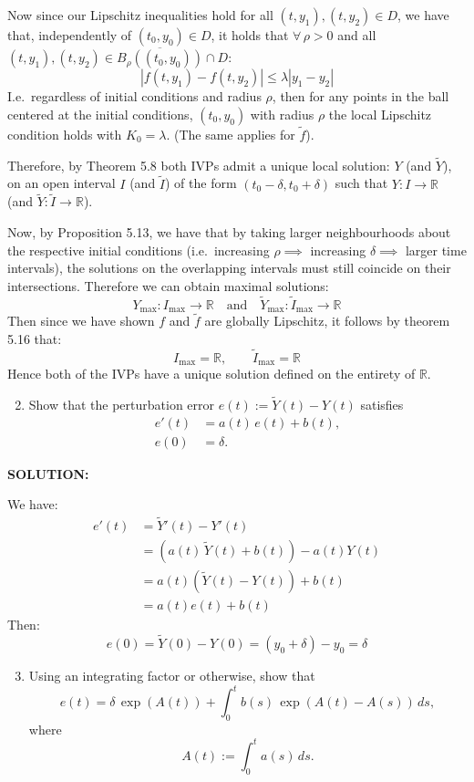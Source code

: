 \documentclass[]{article}
\begin{document}
\noindent Now since our Lipschitz inequalities hold for all $(t,y_1),(t,y_2)\in D$, we have that, independently of $(t_0,y_0)\in D$, it holds that $\forall\, \rho>0$ and all $(t,y_1),(t,y_2)\in \overline{B_{\rho}((t_0,y_0))}\cap D$:
\[
|f(t,y_1)-f(t,y_2)| \leq \lambda |y_1-y_2|
\]
\noindent I.e.\ regardless of initial conditions and radius $\rho$, then for any points in the ball centered at the initial conditions, $(t_0,y_0)$ with radius $\rho$ the local Lipschitz condition holds with $K_0=\lambda$. (The same applies for $\tilde f$).\newline

\noindent Therefore, by Theorem 5.8 both IVPs admit a unique local solution: $Y$ (and $\tilde{Y}$), on an open interval $I$ (and $\tilde I$) of the form $(t_0-\delta,t_0+\delta)$ such that $Y:I\to\mathbb{R}$ (and $\tilde{Y}:\tilde{I}\to\mathbb{R}$).\newline

\noindent Now, by Proposition 5.13, we have that by taking larger neighbourhoods about the respective initial conditions (i.e.\ increasing $\rho \implies$ increasing $\delta \implies $ larger time intervals), the solutions on the overlapping intervals must still coincide on their intersections. \noindent Therefore we can obtain maximal solutions:
\[
Y_{\max}:I_{\max}\to\mathbb{R} \quad \text{and} \quad \tilde Y_{\max}:\tilde I_{\max}\to\mathbb{R}
\]
\noindent Then since we have shown $f$ and $\tilde{f}$ are globally Lipschitz, it follows by theorem 5.16 that:
\[
I_{\max} = \mathbb{R}, \qquad \tilde I_{\max} = \mathbb{R}
\]
\noindent Hence both of the IVPs have a unique solution defined on the entirety of $\mathbb{R}$.



\begin{enumerate}
\setcounter{enumi}{1}
\item Show that the perturbation error $e(t):=\tilde Y(t)-Y(t)$ satisfies
\[
\begin{aligned}
e'(t)&=a(t)\,e(t)+b(t),\\ e(0)&=\delta. 
\end{aligned}
\]
\end{enumerate}
\noindent \textbf{SOLUTION:} \newline

\noindent We have:
\begin{align*}
e'(t) &= \tilde{Y}'(t) - Y'(t)\\
&= \left(a(t)\,\tilde Y(t) + b(t)\right) - a(t)Y(t) \\
      &= a(t)\left(\tilde Y(t) - Y(t)\right) + b(t) \\
      &= a(t)e(t) + b(t)
\end{align*}
\noindent Then:
\[
e(0) = \tilde{Y}(0) - Y(0) = (y_0 + \delta) - y_0 = \delta
\]
\begin{enumerate}
\setcounter{enumi}{2}
\item Using an integrating factor or otherwise, show that
\[
e(t)=\delta\,\exp(A(t))+\int_0^t b(s)\,\exp\left(A(t)-A(s)\right)\,ds, \tag{3}
\]
where
\[
A(t):=\int_0^t a(s)\,ds. \tag{4}
\]

\end{enumerate}
\end{document}
